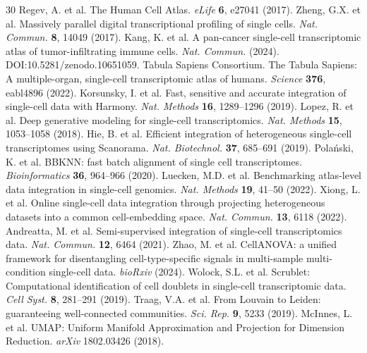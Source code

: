 \documentclass[10pt]{article}
\begin{document}
\begin{thebibliography}{30}
 Regev, A. et al. The Human Cell Atlas. \textit{eLife} \textbf{6}, e27041 (2017).
 Zheng, G.X. et al. Massively parallel digital transcriptional profiling of single cells. \textit{Nat. Commun.} \textbf{8}, 14049 (2017).
 Kang, K. et al. A pan-cancer single-cell transcriptomic atlas of tumor-infiltrating immune cells. \textit{Nat. Commun.} (2024). DOI:10.5281/zenodo.10651059.
 Tabula Sapiens Consortium. The Tabula Sapiens: A multiple-organ, single-cell transcriptomic atlas of humans. \textit{Science} \textbf{376}, eabl4896 (2022).
 Korsunsky, I. et al. Fast, sensitive and accurate integration of single-cell data with Harmony. \textit{Nat. Methods} \textbf{16}, 1289--1296 (2019).
 Lopez, R. et al. Deep generative modeling for single-cell transcriptomics. \textit{Nat. Methods} \textbf{15}, 1053--1058 (2018).
 Hie, B. et al. Efficient integration of heterogeneous single-cell transcriptomes using Scanorama. \textit{Nat. Biotechnol.} \textbf{37}, 685--691 (2019).
 Pola\'{n}ski, K. et al. BBKNN: fast batch alignment of single cell transcriptomes. \textit{Bioinformatics} \textbf{36}, 964--966 (2020).
 Luecken, M.D. et al. Benchmarking atlas-level data integration in single-cell genomics. \textit{Nat. Methods} \textbf{19}, 41--50 (2022).
 Xiong, L. et al. Online single-cell data integration through projecting heterogeneous datasets into a common cell-embedding space. \textit{Nat. Commun.} \textbf{13}, 6118 (2022).
 Andreatta, M. et al. Semi-supervised integration of single-cell transcriptomics data. \textit{Nat. Commun.} \textbf{12}, 6464 (2021).
 Zhao, M. et al. CellANOVA: a unified framework for disentangling cell-type-specific signals in multi-sample multi-condition single-cell data. \textit{bioRxiv} (2024).
 Wolock, S.L. et al. Scrublet: Computational identification of cell doublets in single-cell transcriptomic data. \textit{Cell Syst.} \textbf{8}, 281--291 (2019).
 Traag, V.A. et al. From Louvain to Leiden: guaranteeing well-connected communities. \textit{Sci. Rep.} \textbf{9}, 5233 (2019).
 McInnes, L. et al. UMAP: Uniform Manifold Approximation and Projection for Dimension Reduction. \textit{arXiv} 1802.03426 (2018).

\end{thebibliography}
\end{document}

